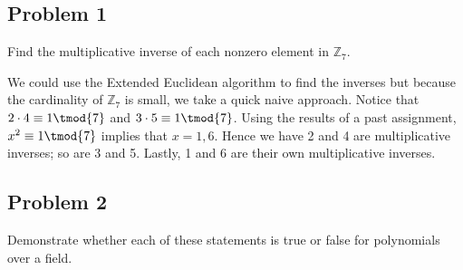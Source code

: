 \documentclass[../hw_sols.tex]{subfiles}
\begin{document}

\subsection*{Problem 1}

Find the multiplicative inverse of each nonzero element in $\mathbb{Z}_7$.

\begin{solution}
We could use the Extended Euclidean algorithm to find the inverses but because 
the cardinality of $\mathbb{Z}_7$ is small, we take a quick naive approach. 
Notice that $2 \cdot 4 \equiv 1 \tmod{7}$ and $3 \cdot 5 \equiv 1 \tmod{7}$. 
Using the results of a past assignment, $x^2 \equiv 1 \tmod{7}$ implies that 
$x = 1, 6$. Hence we have 2 and 4 are multiplicative inverses; so are 3 and 5. 
Lastly, 1 and 6 are their own multiplicative inverses.
\end{solution}


\newpage



\subsection*{Problem 2}

Demonstrate whether each of these statements is true or false for polynomials 
over a field.
\end{document}
